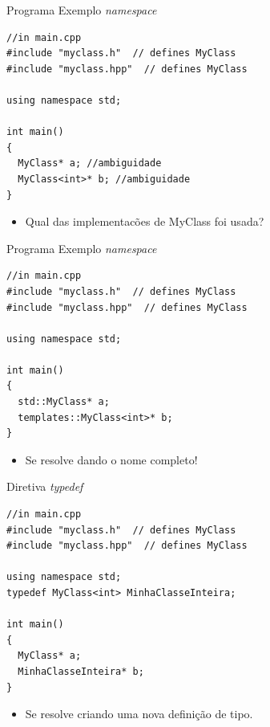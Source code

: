 \documentclass[12pt,table,xcolor={dvipsnames}]{beamer}
\begin{document}
\begin{frame}[fragile]{Programa Exemplo \textit{namespace}}
\begin{lstlisting}
//in main.cpp
#include "myclass.h"  // defines MyClass
#include "myclass.hpp"  // defines MyClass

using namespace std;

int main()
{
  MyClass* a; //ambiguidade
  MyClass<int>* b; //ambiguidade
}
\end{lstlisting}
\begin{itemize}
\item Qual das implementacões de MyClass foi usada?
\end{itemize}
\end{frame}

\begin{frame}[fragile]{Programa Exemplo \textit{namespace}}
\begin{lstlisting}
//in main.cpp
#include "myclass.h"  // defines MyClass
#include "myclass.hpp"  // defines MyClass

using namespace std;

int main()
{
  std::MyClass* a; 
  templates::MyClass<int>* b; 
}
\end{lstlisting}
\begin{itemize}
\item Se resolve dando o nome completo!
\end{itemize}
\end{frame}

\begin{frame}[fragile]{Diretiva \textit{typedef}}
\begin{lstlisting}
//in main.cpp
#include "myclass.h"  // defines MyClass
#include "myclass.hpp"  // defines MyClass

using namespace std;
typedef MyClass<int> MinhaClasseInteira;

int main()
{
  MyClass* a; 
  MinhaClasseInteira* b; 
}
\end{lstlisting}
\begin{itemize}
\item Se resolve criando uma nova definição de tipo.
\end{itemize}
\end{frame}
\end{document}
